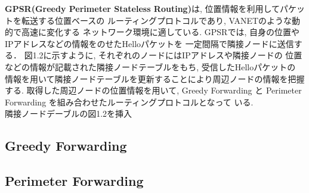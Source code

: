 \textbf{GPSR(Greedy Perimeter Stateless Routing)}\cite{gpsr}は, 
位置情報を利用してパケットを転送する位置ベースの
ルーティングプロトコルであり, VANETのような動的で高速に変化する
ネットワーク環境に適している.
GPSRでは, 自身の位置やIPアドレスなどの情報をのせたHelloパケットを
一定間隔で隣接ノードに送信する．
図1.2に示すように, それぞれのノードにはIPアドレスや隣接ノードの
位置などの情報が記載された隣接ノードテーブルをもち, 受信したHelloパケットの
情報を用いて隣接ノードテーブルを更新することにより周辺ノードの情報を把握する. 
取得した周辺ノードの位置情報を用いて, Greedy Forwarding と 
Perimeter Forwarding を組み合わせたルーティングプロトコルとなって
いる.\\

{\Huge 隣接ノードデーブルの図1.2を挿入}

\subsection{Greedy Forwarding}

\subsection{Perimeter Forwarding}
